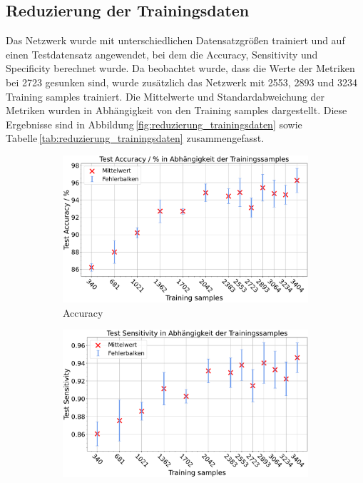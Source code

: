 \subsection{Reduzierung der Trainingsdaten}
Das Netzwerk wurde mit unterschiedlichen Datensatzgrößen trainiert und auf einen Testdatensatz angewendet, bei dem die Accuracy, Sensitivity und Specificity berechnet wurde.
Da beobachtet wurde, dass die Werte der Metriken bei 2723 gesunken sind, wurde zusätzlich das Netzwerk mit 2553, 2893 und 3234 
Training samples trainiert.
Die Mittelwerte und Standardabweichung der Metriken wurden in Abhängigkeit von den Training samples dargestellt.
Diese Ergebnisse sind in Abbildung \ref{fig:reduzierung_trainingsdaten} sowie Tabelle \ref{tab:reduzierung_trainingsdaten} zusammengefasst.
\begin{figure}[H]
  \centering
  \begin{subfigure}[b]{0.48\textwidth}
    \includegraphics[width=\textwidth]{plots/2-Messungen-noTu-Tu_Accuracy_mean.pdf}
    \caption{Accuracy}
    \label{fig:reduzierung_accuracy}
  \end{subfigure}
  \begin{subfigure}[b]{0.48\textwidth}
    \includegraphics[width=\textwidth]{plots/2-Messungen-noTu-Tu_Sensitivity_mean.pdf}

\end{subfigure}
\end{figure}
